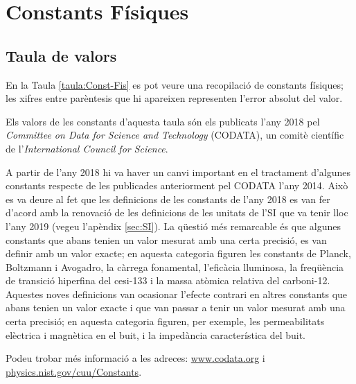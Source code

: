 \chapter{Constants Físiques}\label{sec:const_fis} 

\section{Taula de valors}

En la Taula \vref{taula:Const-Fis} es pot veure una recopilació de
constants físiques; les xifres entre parèntesis que hi apareixen representen l'error absolut del valor.

Els valors de les constants d'aquesta taula són els publicats
l'any 2018 pel \textit{Committee on Data for Science and Technology}
(CODATA), un comitè científic de l'\textit{International Council
for Science}.

A partir de l'any 2018 hi va haver un canvi important en el tractament d'algunes constants respecte de les publicades anteriorment pel CODATA l'any 2014. Això es va deure al fet que les definicions de les constants de l'any 2018 es van fer d'acord amb la renovació de les definicions de les unitats de l'SI que va tenir lloc l'any 2019 (vegeu l'apèndix \ref{sec:SI}). La qüestió més remarcable és que algunes constants que abans tenien un valor mesurat amb una certa precisió, es van definir amb un valor exacte; en aquesta categoria figuren les constants de Planck, Boltzmann i Avogadro, la càrrega fonamental, l'eficàcia lluminosa, la freqüència de transició hiperfina del cesi-133 i la massa atòmica relativa del carboni-12. Aquestes noves definicions van ocasionar l'efecte contrari en altres constants que abans tenien un valor exacte i que van passar a tenir un valor mesurat amb una certa precisió; en aquesta categoria figuren, per exemple, les permeabilitats elèctrica i magnètica en el buit, i la impedància característica del buit.

Podeu trobar  més informació a
les adreces: \href{http://www.codata.org/}{www.codata.org} i \href{http://physics.nist.gov/cuu/Constants/}{physics.nist.gov/cuu/Constants}.

